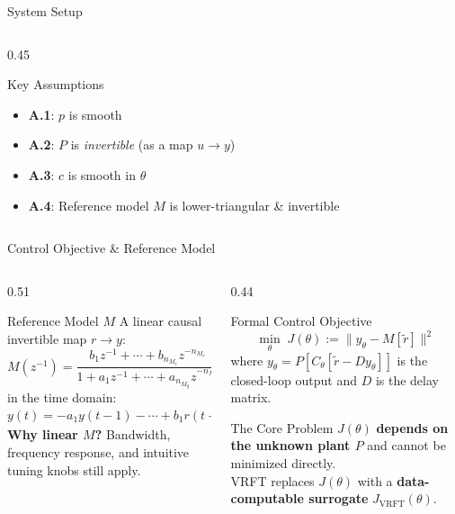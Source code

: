 \documentclass[hyperref={pdfpagemode=FullScreen},aspectratio=169]{beamer}
\newcommand{\highlight}[1]{{\color{accentgreen!70!black}\textbf{#1}}}
\newcommand{\JJ}{J_{\mathrm{VRFT}}}
\newcommand{\Jopt}{J}
\begin{document}
\begin{frame}{System Setup}
\begin{columns}[T]
\begin{column}{0.45\textwidth}
\begin{tikzpicture}[>=Stealth, node distance=1.0cm, font=\small,
          box/.style={draw, rectangle, minimum width=1.1cm, minimum height=0.65cm}]
      \end{tikzpicture}
      \vspace{0.3em}
      \begin{exampleblock}{Key Assumptions}
        \begin{itemize}\small
          \item \textbf{A.1}: $p$ is smooth
          \item \textbf{A.2}: $P$ is \emph{invertible} (as a map $u \to y$)
          \item \textbf{A.3}: $c$ is smooth in $\theta$
          \item \textbf{A.4}: Reference model $M$ is lower-triangular \& invertible
        \end{itemize}
      \end{exampleblock}
    \end{column}
  \end{columns}
\end{frame}

\begin{frame}{Control Objective \& Reference Model}
  \begin{columns}[T]
    \begin{column}{0.51\textwidth}
      \begin{block}{Reference Model $M$}
        A linear causal invertible map $r \to y$:
        \[
          M(z^{-1}) = \frac{b_1 z^{-1}+\cdots+b_{n_{M_r}}z^{-n_{M_r}}}{1 + a_1 z^{-1}+\cdots+a_{n_{M_y}}z^{-n_{M_y}}}
        \]
        in the time domain:
        \small
        \[
          y(t) = -a_1 y(t-1) - \cdots + b_1 r(t-1) + \cdots + b_{n_{M_r}} r(t-n_{M_r})
        \]
        \normalsize
        \textbf{Why linear $M$?} Bandwidth, frequency response, and intuitive tuning knobs still apply.
      \end{block}
    \end{column}
    \begin{column}{0.44\textwidth}
      \begin{block}{Formal Control Objective}
        \[
          \min_\theta \; \Jopt(\theta) := \bigl\|y_\theta - M[\tilde{r}]\bigr\|^2
        \]
        where $y_\theta = P[C_\theta[\tilde{r} - Dy_\theta]]$ is the closed-loop output and $D$ is the delay matrix.
      \end{block}
      \vspace{0.3em}
      \begin{alertblock}{The Core Problem}
        $\Jopt(\theta)$ \textbf{depends on the unknown plant $P$} and cannot be minimized directly.\\[0.4em]
        VRFT replaces $\Jopt(\theta)$ with a \highlight{data-computable surrogate} $\JJ(\theta)$.
      \end{alertblock}
    \end{column}
  \end{columns}
\end{frame}
\end{document}
